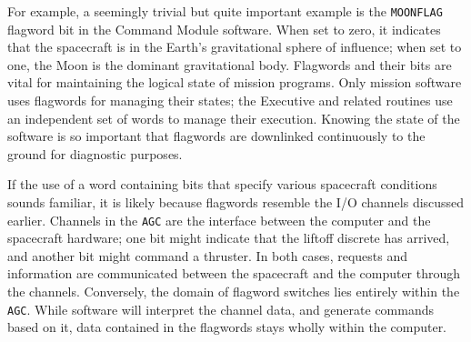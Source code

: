 \documentclass[refcap, oxford]{ahsan}
\begin{document}
For example, a seemingly trivial but quite important example is the \texttt{MOONFLAG} flagword bit in the Command Module software. When set to zero, it indicates that the spacecraft is in the Earth's gravitational sphere of influence; when set to one, the Moon is the dominant gravitational body. Flagwords and their bits are vital for maintaining the logical state of mission programs. Only mission software uses flagwords for managing their states; the Executive and related routines use an independent set of words to manage their execution. Knowing the state of the software is so important that flagwords are downlinked continuously to the ground for diagnostic purposes.

If the use of a word containing bits that specify various spacecraft conditions\\
sounds familiar, it is likely because flagwords resemble the I/O channels discussed earlier. Channels in the \texttt{AGC} are the interface between the computer and the spacecraft hardware; one bit might indicate that the liftoff discrete has arrived, and another bit might command a thruster. In both cases, requests and information are communicated between the spacecraft and the computer through the channels. Conversely, the domain of flagword switches lies entirely within the \texttt{AGC}. While software will interpret the channel data, and generate commands based on it, data contained in the flagwords stays wholly within the computer.
\end{document}
